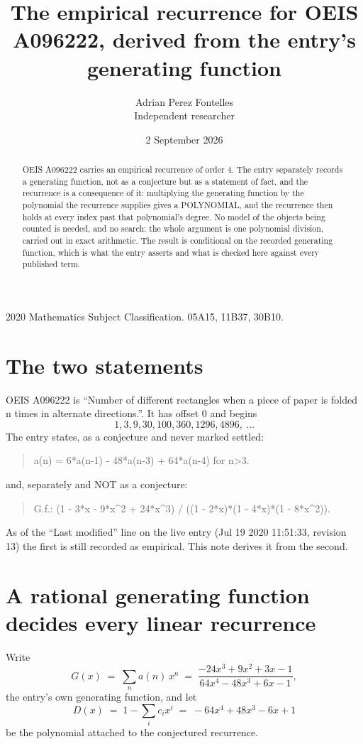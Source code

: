 \documentclass[11pt,a4paper]{article}
\title{The empirical recurrence for OEIS A096222, derived from the entry's generating function}
\author{Adrian Perez Fontelles\\ \small Independent researcher}
\date{2 September 2026}
\theoremstyle{plain}
\theoremstyle{definition}
\begin{document}
\maketitle

\begin{abstract}
OEIS A096222 carries an empirical recurrence of order $4$. The entry separately records a
generating function, not as a conjecture but as a statement of fact, and the recurrence is a
consequence of it: multiplying the generating function by the polynomial the recurrence
supplies gives a POLYNOMIAL, and the recurrence then holds at every index past that
polynomial's degree. No model of the objects being counted is needed, and no search: the
whole argument is one polynomial division, carried out in exact arithmetic. The result is
conditional on the recorded generating function, which is what the entry asserts and what is
checked here against every published term.
\end{abstract}

\noindent\small 2020 Mathematics Subject Classification. 05A15, 11B37, 30B10.\normalsize

\section{The two statements}

OEIS A096222 is ``Number of different rectangles when a piece of paper is folded n times in alternate directions.''. It has offset $0$ and begins
\[
1, 3, 9, 30, 100, 360, 1296, 4896,\ \dots
\]
The entry states, as a conjecture and never marked settled:
\begin{quote}
a(n) = 6*a(n-1) - 48*a(n-3) + 64*a(n-4) for n>3.
\end{quote}
and, separately and NOT as a conjecture:
\begin{quote}
G.f.: (1 - 3*x - 9*x\^{}2 + 24*x\^{}3) / ((1 - 2*x)*(1 - 4*x)*(1 - 8*x\^{}2)).
\end{quote}
As of the ``Last modified'' line on the live entry (Jul 19 2020 11:51:33, revision 13) the first is still
recorded as empirical. This note derives it from the second.

\section{A rational generating function decides every linear recurrence}

Write
\[
G(x)\;=\;\sum_{n}a(n)\,x^{n}\;=\;\frac{- 24 x^{3} + 9 x^{2} + 3 x - 1}{64 x^{4} - 48 x^{3} + 6 x - 1},
\]
the entry's own generating function, and let
\[
D(x)\;=\;1-\sum_i c_i x^{i}\;=\;- 64 x^{4} + 48 x^{3} - 6 x + 1
\]
be the polynomial attached to the conjectured recurrence.
\end{document}
